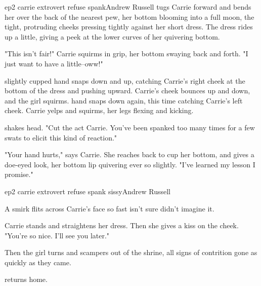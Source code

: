 \documentclass{book}
\begin{document}
\begin{childnode}{ep2 carrie extrovert refuse spank}{Andrew Russell}
    \name{} tugs Carrie forward and bends her over the back of the nearest pew, her bottom blooming into a full moon, the tight, protruding cheeks pressing tightly against her short dress. 
    The dress rides up a little, giving a peek at the lower curves of her 
    quivering bottom.

    "This isn't fair!" Carrie squirms in \names{} grip, her bottom swaying back and forth. "I just want to have a little--oww!"

    \names{} slightly cupped hand snaps down and up, catching Carrie's right cheek at the bottom of the dress and pushing upward. Carrie's cheek bounces up and down, and the girl squirms. \names{} hand snaps down again, this time catching Carrie's left cheek. 
    Carrie yelps and squirms, her legs flexing and kicking.

    \name{} shakes \hisher{} head. "Cut the act Carrie. You've been spanked too many times for a few swats to elicit this kind of reaction."

    "Your hand hurts," says Carrie. She reaches back to cup her bottom, and gives \name{} a doe-eyed look, her bottom lip quivering ever so slightly. "I've learned my lesson I promise."



\end{childnode}

\begin{childnode}{ep2 carrie extrovert refuse spank sissy}{Andrew Russell}


    A smirk flits across Carrie's face so fast \name{} isn't sure \heshe{} didn't imagine it.

    Carrie stands and straightens her dress. Then she gives \name{} a kiss on the cheek. "You're so nice. I'll see you later."

    Then the girl turns and scampers out of the shrine, all signs of contrition gone as quickly as they came.

    \name{} returns home.



\end{childnode}
\end{document}
